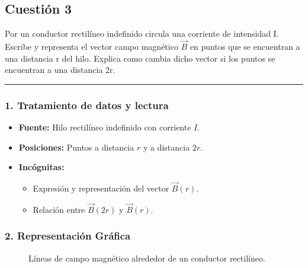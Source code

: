 \newpage
\subsection{Cuestión 3}
\label{subsec:C3_2020_jul_ext_b}

\begin{cajaenunciado}
Por un conductor rectilíneo indefinido circula una corriente de intensidad I. Escribe y representa el vector campo magnético $\vec{B}$ en puntos que se encuentran a una distancia r del hilo. Explica como cambia dicho vector si los puntos se encuentran a una distancia 2r.
\end{cajaenunciado}
\hrule

\subsubsection*{1. Tratamiento de datos y lectura}
\begin{itemize}
    \item \textbf{Fuente:} Hilo rectilíneo indefinido con corriente $I$.
    \item \textbf{Posiciones:} Puntos a distancia $r$ y a distancia $2r$.
    \item \textbf{Incógnitas:}
    \begin{itemize}
        \item Expresión y representación del vector $\vec{B}(r)$.
        \item Relación entre $\vec{B}(2r)$ y $\vec{B}(r)$.
    \end{itemize}
\end{itemize}

\subsubsection*{2. Representación Gráfica}
\begin{figure}[H]
    \centering
    \caption{Líneas de campo magnético alrededor de un conductor rectilíneo.}
\end{figure}

